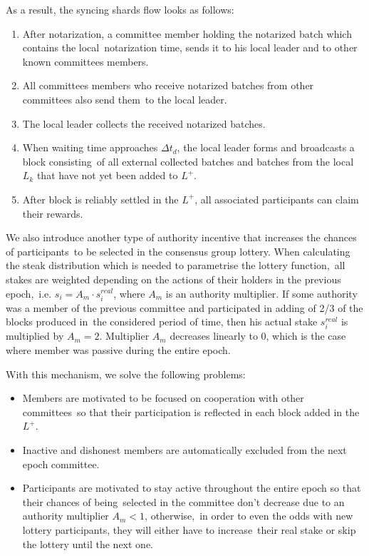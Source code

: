 As a result, the syncing shards flow looks as follows:
\begin{enumerate}
    \item After notarization, a committee member holding the notarized batch which contains the local\
    notarization time, sends it to his local leader and to other known committees members.
    \item All committees members who receive notarized batches from other committees also send them\
    to the local leader.
    \item The local leader collects the received notarized batches.
    \item When waiting time approaches $\Delta t_d$, the local leader forms and broadcasts a block consisting\
    of all external collected batches and batches from the local $L_k$ that have not yet been added to $L^+$.
    \item After block is reliably settled in the $L^+$, all associated participants can claim their rewards.
\end{enumerate}

We also introduce another type of authority incentive that increases the chances of participants\
to be selected in the consensus group lottery.
When calculating the steak distribution which is needed to parametrise the lottery function,\
all stakes are weighted depending on the actions of their holders in the previous epoch,\
i.e. ${s_i = A_m \cdot s_i^{real}}$, where $A_m$ is an authority multiplier.
If some authority was a member of the previous committee and participated in adding of 2/3 of the blocks produced in\
the considered period of time, then his actual stake ${s_i^{real}}$ is multiplied by ${A_m = 2}$.
Multiplier $A_m$ decreases linearly to 0, which is the case where member was passive during the entire epoch.

With this mechanism, we solve the following problems:
\begin{itemize}
    \item Members are motivated to be focused on cooperation with other committees\
    so that their participation is reflected in each block added in the $L^+$.
    \item Inactive and dishonest members are automatically excluded from the next epoch committee.
    \item Participants are motivated to stay active throughout the entire epoch so that their chances of being\
    selected in the committee don't decrease due to an authority multiplier ${A_m < 1}$, otherwise,\
    in order to even the odds with new lottery participants, they will either have to increase\
    their real stake or skip the lottery until the next one.
\end{itemize}

